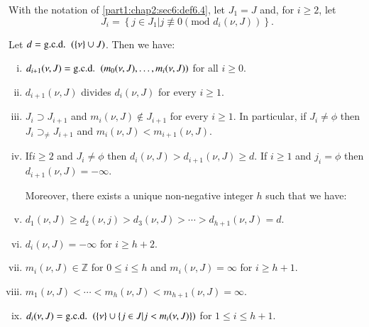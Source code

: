 \begin{lemma}\label{part1:chap2:sec6:lem6.5}
  With the notation of \ref{part1:chap2:sec6:def6.4}, let $J_1= J$ and, for $i \geq 2$, let
$$
J_i = \left\{ j \in J_1 \Big| j \nequiv 0 (\text{mod } d_i (\nu, J)) \right\}.
$$ 
\end{lemma}

Let $d= \text{\gcd}~ (\{ \nu \} \cup J)$. Then we have:
\begin{enumerate}[(i)]
\item $d_{i+1} (\nu , J)= \text{\gcd}~ (m_0 (\nu, J), \ldots , m_i (\nu, J))$ for all $i \geq 0$.

\item $d_{i+1} (\nu, J)$ divides $d_i (\nu, J)$ for every $i\geq 1$.

\item $J_i \supset J_{i+1}$ and $m_i (\nu, J) \notin J_{i+1}$ for every $i \geq 1$. In particular, if $J_{i} \neq \phi$ then $J_i \displaystyle{\mathop{\supset}_{\neq}} J_{i+1}$ and $m_i (\nu, J)< m_{i+1} (\nu, J)$.

\item If\pageoriginale $i \geq 2$ and $J_i \neq \phi$ then $d_i (\nu, J)> d_{i+1}(\nu, J) \geq d$. If $i \geq 1$ and $j_i = \phi$ then $d_{i+1} (\nu, J)=- \infty$.

Moreover, there exists a unique non-negative integer $h$ such that we have:

\item $d_1 (\nu, J) \geq d_2 (\nu, j) > d_3 (\nu, J)> \cdots > d_{h+1} (\nu, J)=d$.

\item $d_i (\nu, J)=- \infty$ for $i \geq h+2$.

\item $m_i (\nu, J) \in \mathbb{Z}$ for $0 \leq i \leq h$ and $m_i (\nu, J)= \infty$ for $i \geq h+1$.

\item $m_1 (\nu, J) < \cdots < m_h (\nu, J) < m_{h+1} (\nu, J)= \infty$.

\item $d_i (\nu, J)=\text{\gcd}~ ( \{ \nu\} \cup \{ j \in J |j < m_i (\nu, J)\} )$ for $1 \leq i \leq h+1$.
\end{enumerate}

